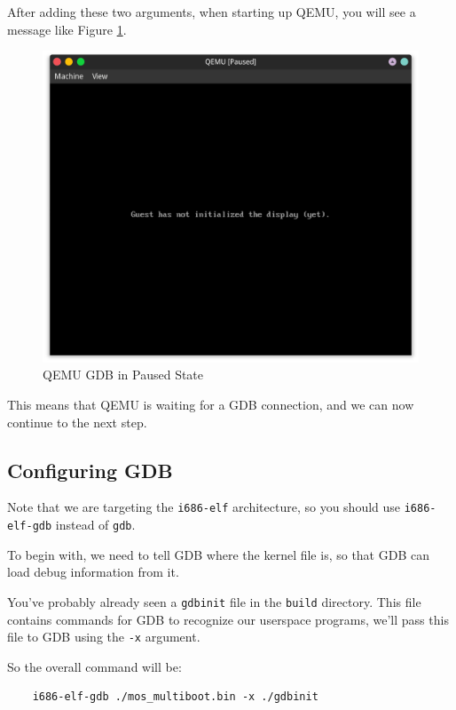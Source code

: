 After adding these two arguments, when starting up QEMU, you will see a message like Figure \ref{fig:qemu-gdb-paused}.

\begin{figure}[ht]
    \centering
    \includegraphics[width=\textwidth]{assets/c1.mos-qemu-gdb-paused.png}
    \caption{QEMU GDB in Paused State}
    \label{fig:qemu-gdb-paused}
\end{figure}

This means that QEMU is waiting for a GDB connection, and we can now continue to the next step.

\subsection{Configuring GDB} \label{sec:gdb-config}

Note that we are targeting the \texttt{i686-elf} architecture, so you should use \texttt{i686-elf-gdb}
instead of \texttt{gdb}.

To begin with, we need to tell GDB where the kernel file is, so that GDB can load debug information
from it.

You've probably already seen a \texttt{gdbinit} file in the \texttt{build} directory. This file
contains commands for GDB to recognize our userspace programs, we'll pass this file to GDB using
the \texttt{-x} argument.

So the overall command will be:

\begin{verbatim}
    i686-elf-gdb ./mos_multiboot.bin -x ./gdbinit
\end{verbatim}

